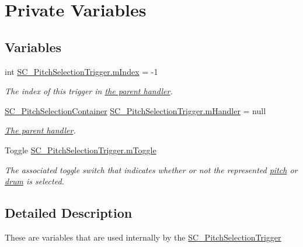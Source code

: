 \hypertarget{group___s_c___p_s_t_priv_var}{}\section{Private Variables}
\label{group___s_c___p_s_t_priv_var}
\subsection*{Variables}
\begin{DoxyCompactItemize}
\item 
int \hyperlink{group___s_c___p_s_t_priv_var_ga7d7771170c1f6cb1d6a9eb41e96a478f}{S\+C\+\_\+\+Pitch\+Selection\+Trigger.\+m\+Index} = -\/1
\begin{DoxyCompactList}\small\item\em The index of this trigger in \hyperlink{group___doc_s_c___p_s_c}{the parent handler}. \end{DoxyCompactList}\item 
\hyperlink{class_s_c___pitch_selection_container}{S\+C\+\_\+\+Pitch\+Selection\+Container} \hyperlink{group___s_c___p_s_t_priv_var_ga23cf7134e224e9718a99949979cd5078}{S\+C\+\_\+\+Pitch\+Selection\+Trigger.\+m\+Handler} = null
\begin{DoxyCompactList}\small\item\em \hyperlink{group___doc_s_c___p_s_c}{The parent handler}. \end{DoxyCompactList}\item 
Toggle \hyperlink{group___s_c___p_s_t_priv_var_ga1ecd33f50c82f6ffda81850438907a31}{S\+C\+\_\+\+Pitch\+Selection\+Trigger.\+m\+Toggle}
\begin{DoxyCompactList}\small\item\em The associated toggle switch that indicates whether or not the represented \hyperlink{group___music_enums_ga508f69b199ea518f935486c990edac1d}{pitch} or \hyperlink{group___music_enums_gade475b4382c7066d1af13e7c13c029b6}{drum} is selected. \end{DoxyCompactList}\end{DoxyCompactItemize}


\subsection{Detailed Description}
These are variables that are used internally by the \hyperlink{class_s_c___pitch_selection_trigger}{S\+C\+\_\+\+Pitch\+Selection\+Trigger} 

